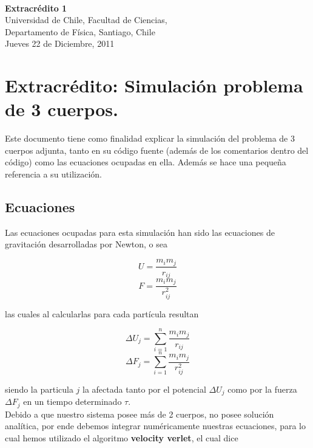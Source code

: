 \documentclass[12pt]{article}
\begin{document}
\begin{center}
\LARGE{}\\
\vspace{0.5cm}
\large{\bf{Extracr\'edito 1}}\\
\vspace{0.5cm}
\scriptsize{Universidad de Chile, Facultad de Ciencias,}\\
\scriptsize{Departamento de F\'isica, Santiago, Chile}\\
\scriptsize{Jueves 22 de Diciembre, 2011}

\vspace{0.5cm}
\end{center}

\begin{flushleft}
\end{flushleft}

\section{ Extracr\'edito: Simulaci\'on problema de 3 cuerpos.}

Este documento tiene como finalidad explicar la simulaci\'on del
problema de 3 cuerpos adjunta,
tanto en su c\'odigo fuente (adem\'as de los comentarios dentro del
c\'odigo) como las ecuaciones ocupadas en ella.
Adem\'as se hace una peque\~na referencia a su utilizaci\'on.

\subsection {Ecuaciones}

Las ecuaciones ocupadas para esta simulaci\'on han sido las ecuaciones
de gravitaci\'on desarrolladas por Newton, o sea

$$U=\frac{m_im_j}{r_{ij}}$$
$$F=\frac{m_im_j}{r_{ij}^2}$$

\noindent las cuales al calcularlas para cada part\'icula resultan

$$\Delta U_j=\sum_{i=1}^n\frac{m_im_j}{r_{ij}}$$
$$\Delta F_j=\sum_{i=1}^n\frac{m_im_j}{r_{ij}^2}$$

\noindent siendo la particula $j$ la afectada tanto por el potencial
$\Delta U_j$ como
por la fuerza $\Delta F_j$ en un tiempo determinado $\tau$.\\

Debido a que nuestro sistema posee m\'as de 2 cuerpos, no posee soluci\'on
anal\'itica, por ende debemos integrar num\'ericamente nuestras
ecuaciones, para lo cual hemos utilizado el algoritmo \textbf{velocity
verlet}, el cual dice
\end{document}
